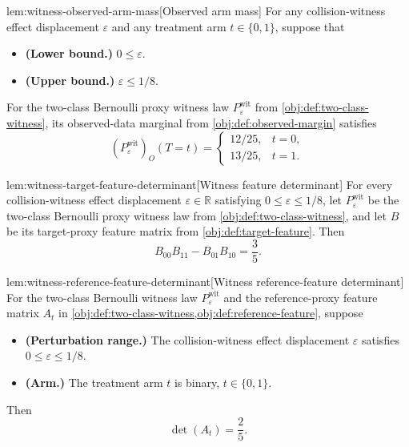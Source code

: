 \begin{lemmav}{lem:witness-observed-arm-mass}[Observed arm mass]
For any collision-witness effect displacement \(\varepsilon\) and any treatment arm \(t\in\{0,1\}\), suppose that
\begin{itemize}
\item \textbf{(Lower bound.)} \(0\le \varepsilon\).
\item \textbf{(Upper bound.)} \(\varepsilon\le 1/8\).
\end{itemize}
For the two-class Bernoulli proxy witness law \(P_{\varepsilon}^{\mathrm{wit}}\) from \cref{obj:def:two-class-witness}, its observed-data marginal from \cref{obj:def:observed-margin} satisfies
\[
(P_{\varepsilon}^{\mathrm{wit}})_O(T=t)
=
\begin{cases}
12/25, & t=0,\\
13/25, & t=1.
\end{cases}
\]
\end{lemmav}

\begin{lemmav}{lem:witness-target-feature-determinant}[Witness feature determinant]
For every collision-witness effect displacement \(\varepsilon\in\mathbb R\) satisfying \(0\le \varepsilon\le 1/8\), let \(P_{\varepsilon}^{\mathrm{wit}}\) be the two-class Bernoulli proxy witness law from \cref{obj:def:two-class-witness}, and let \(B\) be its target-proxy feature matrix from \cref{obj:def:target-feature}. Then
\[
B_{00}B_{11}-B_{01}B_{10}=\frac35 .
\]
\end{lemmav}

\begin{lemmav}{lem:witness-reference-feature-determinant}[Witness reference-feature determinant]
For the two-class Bernoulli witness law \(P_{\varepsilon}^{\mathrm{wit}}\) and the reference-proxy feature matrix \(A_t\) in \cref{obj:def:two-class-witness,obj:def:reference-feature}, suppose
\begin{itemize}
\item \textbf{(Perturbation range.)} The collision-witness effect displacement \(\varepsilon\) satisfies \(0\le \varepsilon\le 1/8\).
\item \textbf{(Arm.)} The treatment arm \(t\) is binary, \(t\in\{0,1\}\).
\end{itemize}
Then
\[
\det(A_t)=\frac25 .
\]
\end{lemmav}

